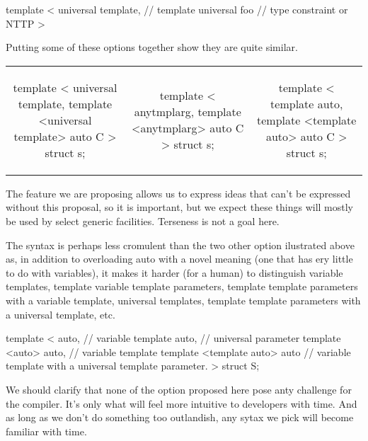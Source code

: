 \documentclass{wg21}
\begin{document}
\begin{colorblock}
template <
        universal template, // template
        universal foo       // type constraint or NTTP
>
\end{colorblock}

Putting some of these options together show they are quite similar.

\begin{table}
\tiny
\hspace{-30pt}
\begin{tabular}{c | c | c}
\begin{colorblock}
template <
  universal template,
  template <universal template> auto C
>
struct s;
\end{colorblock}
&
\begin{colorblock}
template <
  anytmplarg,
  template <anytmplarg> auto C
>
struct s;
\end{colorblock}
&
\begin{colorblock}
template <
  template auto,
  template <template auto> auto C
>
struct s;
\end{colorblock}
\end{tabular}
\end{table}


The feature we are proposing allows us to express ideas that can't be expressed without this proposal, so it is important,
but we expect these things will mostly be used by select generic facilities. Terseness is not a goal here.

The  syntax is perhaps less cromulent than the two other option ilustrated above as, in addition to overloading
auto with a novel meaning (one that has ery little to do with variables), it makes it harder (for a human) to distinguish
variable templates, template variable template parameters, template template parameters with a variable template, universal templates,
template template parameters with a universal template, etc.

\begin{colorblock}
template <
   auto, // variable
   template auto, // universal parameter
   template <auto> auto, // variable template
   template <template auto> auto // variable template with a universal template parameter.
>
struct S;
\end{colorblock}


We should clarify that none of the option proposed here pose anty challenge for the compiler. It's only what will feel more intuitive to
developers with time. And as long as we don't do something too outlandish, any sytax we pick will become familiar with time.
\end{document}
